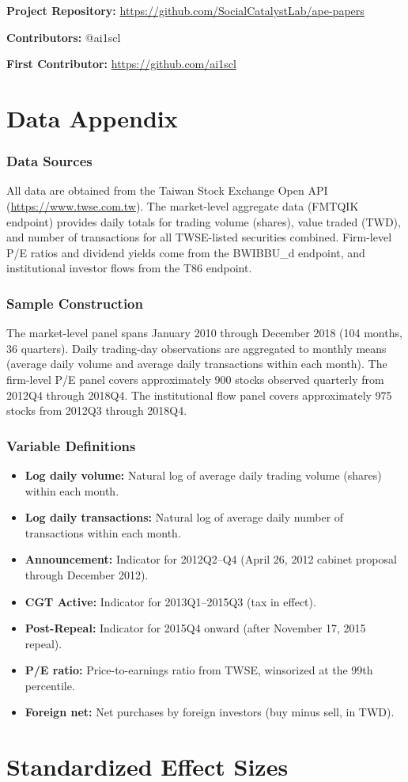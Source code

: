 \documentclass[12pt]{article}
\begin{document}
\noindent\textbf{Project Repository:} \url{https://github.com/SocialCatalystLab/ape-papers}

\noindent\textbf{Contributors:} @ai1scl

\noindent\textbf{First Contributor:} \url{https://github.com/ai1scl}

\label{apep_main_text_end}
\newpage


\newpage
\appendix

\section{Data Appendix}

\subsubsection*{Data Sources} All data are obtained from the Taiwan Stock Exchange Open API (\url{https://www.twse.com.tw}). The market-level aggregate data (FMTQIK endpoint) provides daily totals for trading volume (shares), value traded (TWD), and number of transactions for all TWSE-listed securities combined. Firm-level P/E ratios and dividend yields come from the BWIBBU\_d endpoint, and institutional investor flows from the T86 endpoint.

\subsubsection*{Sample Construction} The market-level panel spans January 2010 through December 2018 (104 months, 36 quarters). Daily trading-day observations are aggregated to monthly means (average daily volume and average daily transactions within each month). The firm-level P/E panel covers approximately 900 stocks observed quarterly from 2012Q4 through 2018Q4. The institutional flow panel covers approximately 975 stocks from 2012Q3 through 2018Q4.

\subsubsection*{Variable Definitions}
\begin{itemize}
\item \textbf{Log daily volume:} Natural log of average daily trading volume (shares) within each month.
\item \textbf{Log daily transactions:} Natural log of average daily number of transactions within each month.
\item \textbf{Announcement:} Indicator for 2012Q2--Q4 (April 26, 2012 cabinet proposal through December 2012).
\item \textbf{CGT Active:} Indicator for 2013Q1--2015Q3 (tax in effect).
\item \textbf{Post-Repeal:} Indicator for 2015Q4 onward (after November 17, 2015 repeal).
\item \textbf{P/E ratio:} Price-to-earnings ratio from TWSE, winsorized at the 99th percentile.
\item \textbf{Foreign net:} Net purchases by foreign investors (buy minus sell, in TWD).
\end{itemize}


\section{Standardized Effect Sizes}
\label{sec:sde}


\end{document}
